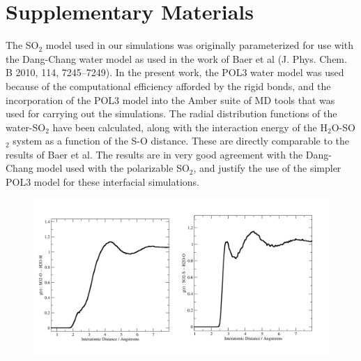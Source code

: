 \documentclass{article}
\begin{document}
\newcommand{\suldiox}{SO$_2$}
\newcommand{\ang}{\,$\textrm{\AA}$}
\newcommand{\angs}{\ang}
\newcommand{\wat}{H$_2$O}

\doublespacing

\section* {Supplementary Materials}

The SO$_2$ model used in our simulations was originally parameterized for use with the Dang-Chang water model as used in the work of Baer et al (J. Phys. Chem. B 2010, 114, 7245–7249). In the present work, the POL3 water model was used because of the computational efficiency afforded by the rigid bonds, and the incorporation of the POL3 model into the Amber suite of MD tools that was used for carrying out the simulations. The radial distribution functions of the water-SO$_2$ have been calculated, along with the interaction energy of the H$_2$O-SO$_2$ system as a function of the S-O distance. These are directly comparable to the results of Baer et al. The results are in very good agreement with the Dang-Chang model used with the polarizable SO$_2$, and justify the use of the simpler POL3 model for these interfacial simulations.


\begin{figure}[h!]
	\begin{center}
		\includegraphics[scale=1.0]{rdf.png}
	\end{center}
\end{figure}
\end{document}
